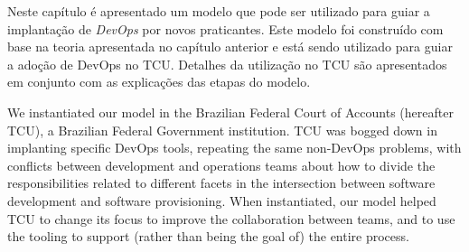 Neste capítulo é apresentado um modelo que pode ser utilizado para guiar a
implantação de \textit{DevOps} por novos praticantes. Este modelo foi construído
com base na teoria apresentada no capítulo anterior e está sendo
utilizado para guiar a adoção de DevOps no \acrshort{TCU}. Detalhes da
utilização no \acrshort{TCU} são apresentados em conjunto com as explicações
das etapas do modelo.

We instantiated our model in the Brazilian Federal Court of Accounts (hereafter TCU), a Brazilian Federal
Government institution. TCU was bogged down in implanting specific DevOps tools, repeating the same non-DevOps problems, with
conflicts between development and operations teams about how to divide the responsibilities related to different facets in the intersection between software development and software provisioning.
When instantiated, our model helped TCU to change its focus to
improve the collaboration between teams, and to use the tooling
to support (rather than being the goal of) the entire process.
